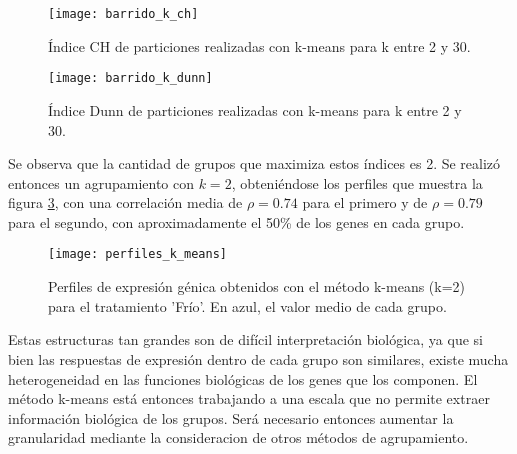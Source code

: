 \clearpage
\begin{figure*}[t!]
    \centering
    \begin{subfigure}[t]{0.7\textwidth}
    \centering
    \texttt{[image: barrido\_k\_ch]}
    \caption{Índice CH de particiones realizadas con k-means para k entre 2 y 30.}
    \label{fig:barrido_k_ch}
    \end{subfigure}
    \begin{subfigure}[t]{0.7\textwidth}
    \centering
    \texttt{[image: barrido\_k\_dunn]}
    \caption{Índice Dunn de particiones realizadas con k-means para k entre 2 y 30.}
    \label{fig:barrido_k_dunn}
    \end{subfigure}
    \caption{Índices de validación interna para particiones realizadas con k-means}
\end{figure*}
Se observa que la cantidad de grupos que maximiza estos índices es 2. Se realizó entonces un agrupamiento con $k=2$, obteniéndose los perfiles que muestra la figura \ref{fig:perfiles_k_means}, con una correlación media de $\rho=0.74$ para el primero y de  $\rho=0.79$ para el segundo, con aproximadamente el 50\% de los genes en cada grupo.
\begin{figure}[h]
    \centering
    \texttt{[image: perfiles\_k\_means]}
    \caption{Perfiles de expresión génica obtenidos con el método k-means (k=2) para el tratamiento 'Frío'. En azul, el valor medio de cada grupo.}
    \label{fig:perfiles_k_means}
\end{figure}
Estas estructuras tan grandes son de difícil interpretación biológica, ya que si bien las respuestas de expresión dentro de cada grupo son similares, existe mucha heterogeneidad en las funciones biológicas de los genes que los componen. El método k-means está entonces trabajando a una escala que no permite extraer información biológica de los grupos. Será necesario entonces aumentar la granularidad mediante la consideracion de otros métodos de agrupamiento.
